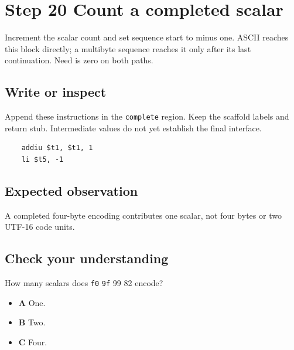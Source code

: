 \section{Step 20 Count a completed scalar}\label{utf8-s20}

Increment the scalar count and set sequence start to minus one. ASCII reaches this block directly; a multibyte sequence reaches it only after its last continuation. Need is zero on both paths.

\subsection{Write or inspect}
Append these instructions in the \texttt{complete} region. Keep the scaffold labels and return stub. Intermediate values do not yet establish the final interface.

\begin{verbatim}
    addiu $t1, $t1, 1
    li $t5, -1
\end{verbatim}

\subsection{Expected observation}
A completed four-byte encoding contributes one scalar, not four bytes or two UTF-16 code units.

\subsection{Check your understanding}
How many scalars does \texttt{f0} \texttt{9f} 99 82 encode?

\begin{itemize}
  \item \textbf{A} One.
  \item \textbf{B} Two.
  \item \textbf{C} Four.
\end{itemize}
